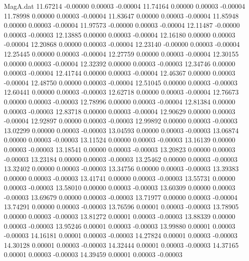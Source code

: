 \begin{filecontents}{MagA.dat}
  11.67214   -0.00000    0.00003   -0.00004
  11.74164    0.00000    0.00003   -0.00004
  11.78998    0.00000    0.00003   -0.00004
  11.83647    0.00000    0.00003   -0.00004
  11.85948    0.00000    0.00003   -0.00004
  11.97573   -0.00000    0.00003   -0.00004
  12.11487   -0.00000    0.00003   -0.00003
  12.13885    0.00000    0.00003   -0.00004
  12.16180    0.00000    0.00003   -0.00004
  12.20868    0.00000    0.00003   -0.00004
  12.23140   -0.00000    0.00003   -0.00004
  12.25445    0.00000    0.00003   -0.00004
  12.27759    0.00000    0.00003   -0.00004
  12.30155    0.00000    0.00003   -0.00004
  12.32392    0.00000    0.00003   -0.00003
  12.34746    0.00000    0.00003   -0.00004
  12.41744    0.00000    0.00003   -0.00004
  12.46367    0.00000    0.00003   -0.00004
  12.48750    0.00000    0.00003   -0.00004
  12.51045    0.00000    0.00003   -0.00003
  12.60441    0.00000    0.00003   -0.00003
  12.62718    0.00000    0.00003   -0.00004
  12.76673    0.00000    0.00003   -0.00003
  12.78996    0.00000    0.00003   -0.00004
  12.81384    0.00000    0.00003   -0.00003
  12.83718    0.00000    0.00003   -0.00004
  12.90629    0.00000    0.00003   -0.00004
  12.92897    0.00000    0.00003   -0.00003
  12.99892    0.00000    0.00003   -0.00003
  13.02299    0.00000    0.00003   -0.00003
  13.04593    0.00000    0.00003   -0.00003
  13.06874    0.00000    0.00003   -0.00003
  13.11524    0.00000    0.00003   -0.00003
  13.16139    0.00000    0.00003   -0.00003
  13.18541    0.00000    0.00003   -0.00003
  13.20823    0.00000    0.00003   -0.00003
  13.23184    0.00000    0.00003   -0.00003
  13.25462    0.00000    0.00003   -0.00003
  13.32402    0.00000    0.00003   -0.00003
  13.34756    0.00000    0.00003   -0.00003
  13.39383    0.00000    0.00003   -0.00003
  13.41741    0.00000    0.00003   -0.00003
  13.55731    0.00000    0.00003   -0.00003
  13.58010    0.00000    0.00003   -0.00003
  13.60309    0.00000    0.00003   -0.00003
  13.69679    0.00000    0.00003   -0.00003
  13.71977    0.00000    0.00003   -0.00004
  13.74291    0.00000    0.00003   -0.00003
  13.76596    0.00001    0.00003   -0.00003
  13.78905    0.00000    0.00003   -0.00003
  13.81272    0.00001    0.00003   -0.00003
  13.88339    0.00000    0.00003   -0.00003
  13.95246    0.00001    0.00003   -0.00003
  13.99880    0.00001    0.00003   -0.00003
  14.16181    0.00001    0.00003   -0.00003
  14.27824    0.00001    0.00003   -0.00003
  14.30128    0.00001    0.00003   -0.00003
  14.32444    0.00001    0.00003   -0.00003
  14.37165    0.00001    0.00003   -0.00003
  14.39459    0.00001    0.00003   -0.00003

\end{filecontents}
